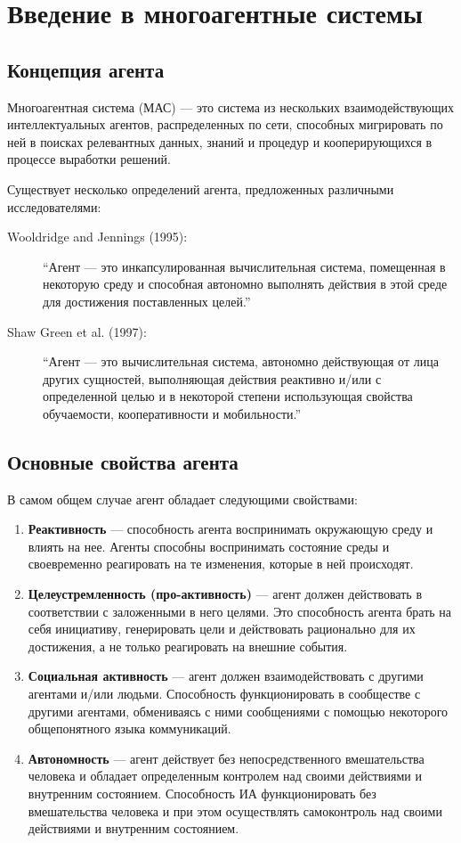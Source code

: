
\section{Введение в многоагентные системы}

\subsection{Концепция агента}

Многоагентная система (МАС) — это система из нескольких взаимодействующих интеллектуальных агентов, распределенных по сети, способных мигрировать по ней в поисках релевантных данных, знаний и процедур и кооперирующихся в процессе выработки решений.

Существует несколько определений агента, предложенных различными исследователями:

\begin{description}
  \item[Wooldridge and Jennings (1995):] ``Агент — это инкапсулированная вычислительная система, помещенная в некоторую среду и способная автономно выполнять действия в этой среде для достижения поставленных целей.''
  \item[Shaw Green et al. (1997):] ``Агент — это вычислительная система, автономно действующая от лица других сущностей, выполняющая действия реактивно и/или с определенной целью и в некоторой степени использующая свойства обучаемости, кооперативности и мобильности.''
\end{description}

\subsection{Основные свойства агента}

В самом общем случае агент обладает следующими свойствами:

\begin{enumerate}
  \item \textbf{Реактивность} — способность агента воспринимать окружающую среду и влиять на нее. Агенты способны воспринимать состояние среды и своевременно реагировать на те изменения, которые в ней происходят.
  \item \textbf{Целеустремленность (про-активность)} — агент должен действовать в соответствии с заложенными в него целями. Это способность агента брать на себя инициативу, генерировать цели и действовать рационально для их достижения, а не только реагировать на внешние события.
  \item \textbf{Социальная активность} — агент должен взаимодействовать с другими агентами и/или людьми. Способность функционировать в сообществе с другими агентами, обмениваясь с ними сообщениями с помощью некоторого общепонятного языка коммуникаций.
  \item \textbf{Автономность} — агент действует без непосредственного вмешательства человека и обладает определенным контролем над своими действиями и внутренним состоянием. Способность ИА функционировать без вмешательства человека и при этом осуществлять самоконтроль над своими действиями и внутренним состоянием.
\end{enumerate}

